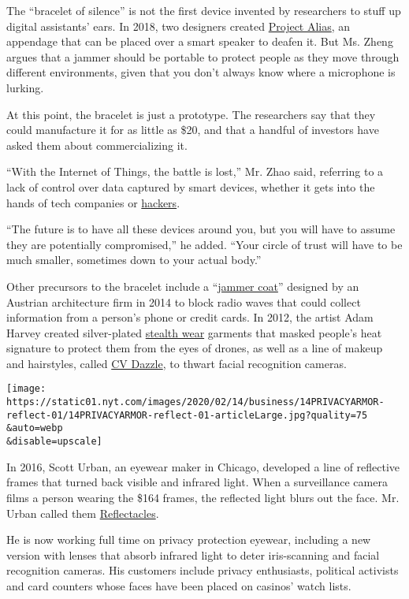 The ``bracelet of silence'' is not the first device invented by
researchers to stuff up digital assistants' ears. In 2018, two designers
created \href{http://bjoernkarmann.dk/project_alias}{Project Alias}, an
appendage that can be placed over a smart speaker to deafen it. But Ms.
Zheng argues that a jammer should be portable to protect people as they
move through different environments, given that you don't always know
where a microphone is lurking.

At this point, the bracelet is just a prototype. The researchers say
that they could manufacture it for as little as \$20, and that a handful
of investors have asked them about commercializing it.

``With the Internet of Things, the battle is lost,'' Mr. Zhao said,
referring to a lack of control over data captured by smart devices,
whether it gets into the hands of tech companies or
\href{https://www.nytimes.com/2019/12/15/us/Hacked-ring-home-security-cameras.html}{hackers}.

``The future is to have all these devices around you, but you will have
to assume they are potentially compromised,'' he added. ``Your circle of
trust will have to be much smaller, sometimes down to your actual
body.''

Other precursors to the bracelet include a
``\href{http://www.coop-himmelblau.at/architecture/projects/chbl-jammer-coat}{jammer
coat}'' designed by an Austrian architecture firm in 2014 to block radio
waves that could collect information from a person's phone or credit
cards. In 2012, the artist Adam Harvey created silver-plated
\href{https://ahprojects.com/stealth-wear/}{stealth wear} garments that
masked people's heat signature to protect them from the eyes of drones,
as well as a line of makeup and hairstyles, called
\href{https://cvdazzle.com/}{CV Dazzle}, to thwart facial recognition
cameras.

\texttt{[image: https://static01.nyt.com/images/2020/02/14/business/14PRIVACYARMOR-reflect-01/14PRIVACYARMOR-reflect-01-articleLarge.jpg?quality=75\\\&auto=webp\\\&disable=upscale]}

In 2016, Scott Urban, an eyewear maker in Chicago, developed a line of
reflective frames that turned back visible and infrared light. When a
surveillance camera films a person wearing the \$164 frames, the
reflected light blurs out the face. Mr. Urban called them
\href{https://www.reflectacles.com/}{Reflectacles}.

He is now working full time on privacy protection eyewear, including a
new version with lenses that absorb infrared light to deter
iris-scanning and facial recognition cameras. His customers include
privacy enthusiasts, political activists and card counters whose faces
have been placed on casinos' watch lists.

